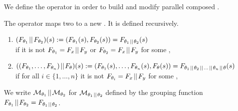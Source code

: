 \documentclass[preview]{standalone}
\begin{document}
We define the operator \pll in order to build and modify parallel composed \viewsN. 

\begin{definition}
	The operator \pll maps two \grpfctsN to a new \grpfctN. It is defined recursively.
	\begin{enumerate}
		\item $(\grpfct[\viewppty_1] \pll \grpfct[\viewppty_2])(\state) := (\grpfct[\viewppty_1](\state),\grpfct[\viewppty_2](\state)) = \grpfct[\viewppty_1 \pll \viewppty_2](\state)$ \\
		if it is not $\grpfct[\viewppty_1] = \grpfct[x] \pll \grpfct[y]$ or $\grpfct[\viewppty_2] = \grpfct[x] \pll \grpfct[y]$ for some \grpfctsN \grpfct[x], \grpfct[y]
		\item $((\grpfct[\viewppty_1], \dots, \grpfct[\viewppty_n]) \pll \grpfct[\viewppty])(\state) := (\grpfct[\viewppty_1](\state), \dots, \grpfct[\viewppty_n](\state), \grpfct[\viewppty](\state)) = \grpfct[{\viewppty_1 \pll \viewppty_2 \pll \dots \pll \viewppty_n \pll \viewppty}](\state)$ 
		\\ if for all $i \in \{1, \dots, n\}$ it is not $\grpfct[\viewppty_i] = \grpfct[x] \pll \grpfct[y]$ for some \grpfctsN \grpfct[x], \grpfct[y]
	\end{enumerate}
	
\end{definition}


We write $\view[\viewppty_1] \pll \view[\viewppty_2]$ for $\view[\viewppty_1 \pll \viewppty_2]$ defined by the grouping function \grpfctN $\grpfct[\viewppty_1] \pll \grpfct[\viewppty_2] = \grpfct[\viewppty_1 \pll \viewppty_2]$.


\end{document}
